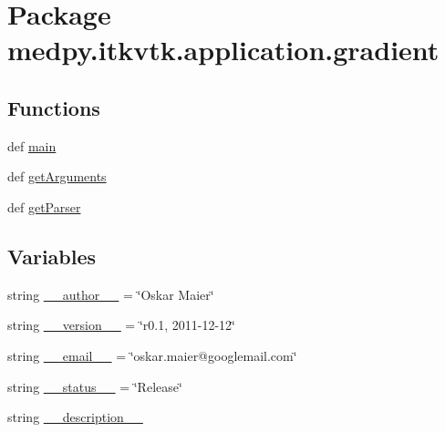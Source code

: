 \hypertarget{namespacemedpy_1_1itkvtk_1_1application_1_1gradient}{
\section{Package medpy.itkvtk.application.gradient}
\label{namespacemedpy_1_1itkvtk_1_1application_1_1gradient}
}
\subsection*{Functions}
\begin{DoxyCompactItemize}
\item 
def \hyperlink{namespacemedpy_1_1itkvtk_1_1application_1_1gradient_a47a8b26569c4b1f273b4c12ac3f6ebaa}{main}
\item 
def \hyperlink{namespacemedpy_1_1itkvtk_1_1application_1_1gradient_a40cf8babcc4b270342b64a83e63b9704}{getArguments}
\item 
def \hyperlink{namespacemedpy_1_1itkvtk_1_1application_1_1gradient_a961d236066b033c9a036da78e6541721}{getParser}
\end{DoxyCompactItemize}
\subsection*{Variables}
\begin{DoxyCompactItemize}
\item 
string \hyperlink{namespacemedpy_1_1itkvtk_1_1application_1_1gradient_ae7317d6c2fac33f4046e6b1a325dab31}{\_\-\_\-author\_\-\_\-} = \char`\"{}Oskar Maier\char`\"{}
\item 
string \hyperlink{namespacemedpy_1_1itkvtk_1_1application_1_1gradient_a4eda595d2c8ce8a62c59b1f464b8cf61}{\_\-\_\-version\_\-\_\-} = \char`\"{}r0.1, 2011-\/12-\/12\char`\"{}
\item 
string \hyperlink{namespacemedpy_1_1itkvtk_1_1application_1_1gradient_a65a22f3617c778551fa3911c60b82ed6}{\_\-\_\-email\_\-\_\-} = \char`\"{}oskar.maier@googlemail.com\char`\"{}
\item 
string \hyperlink{namespacemedpy_1_1itkvtk_1_1application_1_1gradient_a22567d9ffa205e4546e50f1ee5162859}{\_\-\_\-status\_\-\_\-} = \char`\"{}Release\char`\"{}
\item 
string \hyperlink{namespacemedpy_1_1itkvtk_1_1application_1_1gradient_a4e1790a68d670d6345dc23be43b5189c}{\_\-\_\-description\_\-\_\-}
\end{DoxyCompactItemize}


